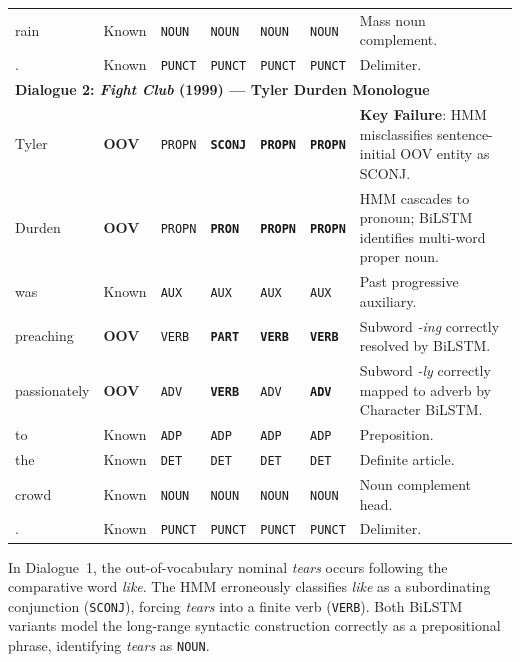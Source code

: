 \documentclass[conference]{IEEEtran}
\begin{document}
\begin{table}[!t]
\begin{tabular*}{\textwidth}{@{\extracolsep{\fill}}llllllp{8.4cm}@{}}
rain      & Known   & \texttt{NOUN}  & \texttt{NOUN}  & \texttt{NOUN}  & \texttt{NOUN}  & Mass noun complement. \\
.         & Known   & \texttt{PUNCT} & \texttt{PUNCT} & \texttt{PUNCT} & \texttt{PUNCT} & Delimiter. \\
\midrule
\multicolumn{7}{l}{\textbf{Dialogue 2: \textit{Fight Club} (1999) --- Tyler Durden Monologue}} \\
Tyler        & \textbf{OOV} & \texttt{PROPN} & \textbf{\texttt{SCONJ}} & \textbf{\texttt{PROPN}} & \textbf{\texttt{PROPN}} & \textbf{Key Failure}: HMM misclassifies sentence-initial OOV entity as SCONJ. \\
Durden       & \textbf{OOV} & \texttt{PROPN} & \textbf{\texttt{PRON}}  & \textbf{\texttt{PROPN}} & \textbf{\texttt{PROPN}} & HMM cascades to pronoun; BiLSTM identifies multi-word proper noun. \\
was          & Known        & \texttt{AUX}   & \texttt{AUX}   & \texttt{AUX}   & \texttt{AUX}   & Past progressive auxiliary. \\
preaching    & \textbf{OOV} & \texttt{VERB}  & \textbf{\texttt{PART}}  & \textbf{\texttt{VERB}}  & \textbf{\texttt{VERB}}  & Subword \textit{-ing} correctly resolved by BiLSTM. \\
passionately & \textbf{OOV} & \texttt{ADV}   & \textbf{\texttt{VERB}}  & \texttt{ADV}   & \textbf{\texttt{ADV}}   & Subword \textit{-ly} correctly mapped to adverb by Character BiLSTM. \\
to           & Known        & \texttt{ADP}   & \texttt{ADP}   & \texttt{ADP}   & \texttt{ADP}   & Preposition. \\
the          & Known        & \texttt{DET}   & \texttt{DET}   & \texttt{DET}   & \texttt{DET}   & Definite article. \\
crowd        & Known        & \texttt{NOUN}  & \texttt{NOUN}  & \texttt{NOUN}  & \texttt{NOUN}  & Noun complement head. \\
.            & Known        & \texttt{PUNCT} & \texttt{PUNCT} & \texttt{PUNCT} & \texttt{PUNCT} & Delimiter. \\
\bottomrule
\end{tabular*}
\end{table}

In Dialogue~1, the out-of-vocabulary nominal \textit{tears} occurs following the comparative word \textit{like}. The HMM erroneously classifies \textit{like} as a subordinating conjunction (\texttt{SCONJ}), forcing \textit{tears} into a finite verb (\texttt{VERB}). Both BiLSTM variants model the long-range syntactic construction correctly as a prepositional phrase, identifying \textit{tears} as \texttt{NOUN}.
\end{document}
